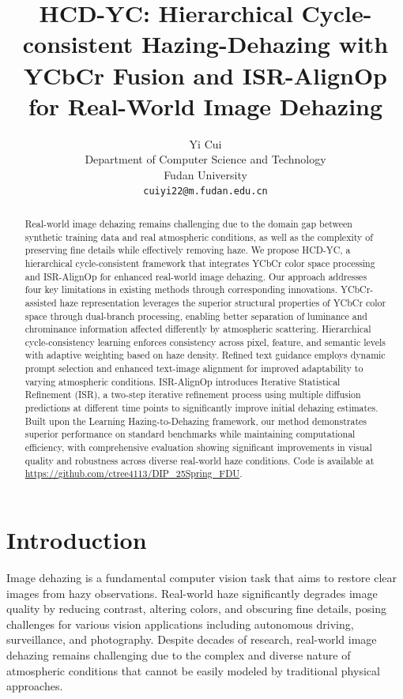 \documentclass{article}
\title{HCD-YC: Hierarchical Cycle-consistent Hazing-Dehazing with YCbCr Fusion and ISR-AlignOp for Real-World Image Dehazing}
\author{%
  Yi Cui \\
  Department of Computer Science and Technology \\
  Fudan University \\
  \texttt{cuiyi22@m.fudan.edu.cn} \\
}
\begin{document}
\maketitle


\begin{abstract}
Real-world image dehazing remains challenging due to the domain gap between synthetic training data and real atmospheric conditions, as well as the complexity of preserving fine details while effectively removing haze. We propose HCD-YC, a hierarchical cycle-consistent framework that integrates YCbCr color space processing and ISR-AlignOp for enhanced real-world image dehazing. Our approach addresses four key limitations in existing methods through corresponding innovations. YCbCr-assisted haze representation leverages the superior structural properties of YCbCr color space through dual-branch processing, enabling better separation of luminance and chrominance information affected differently by atmospheric scattering. Hierarchical cycle-consistency learning enforces consistency across pixel, feature, and semantic levels with adaptive weighting based on haze density. Refined text guidance employs dynamic prompt selection and enhanced text-image alignment for improved adaptability to varying atmospheric conditions. ISR-AlignOp introduces Iterative Statistical Refinement (ISR), a two-step iterative refinement process using multiple diffusion predictions at different time points to significantly improve initial dehazing estimates. Built upon the Learning Hazing-to-Dehazing framework, our method demonstrates superior performance on standard benchmarks while maintaining computational efficiency, with comprehensive evaluation showing significant improvements in visual quality and robustness across diverse real-world haze conditions. Code is available at \url{https://github.com/ctree4113/DIP_25Spring_FDU}.
\end{abstract}


\section{Introduction}

Image dehazing is a fundamental computer vision task that aims to restore clear images from hazy observations. Real-world haze significantly degrades image quality by reducing contrast, altering colors, and obscuring fine details, posing challenges for various vision applications including autonomous driving, surveillance, and photography. Despite decades of research, real-world image dehazing remains challenging due to the complex and diverse nature of atmospheric conditions that cannot be easily modeled by traditional physical approaches.
\end{document}
